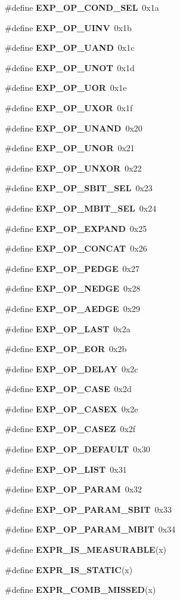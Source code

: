 \begin{CompactItemize}
\#define {\bf EXP\_\-OP\_\-COND\_\-SEL}\ 0x1a
\item 
\#define {\bf EXP\_\-OP\_\-UINV}\ 0x1b
\item 
\#define {\bf EXP\_\-OP\_\-UAND}\ 0x1c
\item 
\#define {\bf EXP\_\-OP\_\-UNOT}\ 0x1d
\item 
\#define {\bf EXP\_\-OP\_\-UOR}\ 0x1e
\item 
\#define {\bf EXP\_\-OP\_\-UXOR}\ 0x1f
\item 
\#define {\bf EXP\_\-OP\_\-UNAND}\ 0x20
\item 
\#define {\bf EXP\_\-OP\_\-UNOR}\ 0x21
\item 
\#define {\bf EXP\_\-OP\_\-UNXOR}\ 0x22
\item 
\#define {\bf EXP\_\-OP\_\-SBIT\_\-SEL}\ 0x23
\item 
\#define {\bf EXP\_\-OP\_\-MBIT\_\-SEL}\ 0x24
\item 
\#define {\bf EXP\_\-OP\_\-EXPAND}\ 0x25
\item 
\#define {\bf EXP\_\-OP\_\-CONCAT}\ 0x26
\item 
\#define {\bf EXP\_\-OP\_\-PEDGE}\ 0x27
\item 
\#define {\bf EXP\_\-OP\_\-NEDGE}\ 0x28
\item 
\#define {\bf EXP\_\-OP\_\-AEDGE}\ 0x29
\item 
\#define {\bf EXP\_\-OP\_\-LAST}\ 0x2a
\item 
\#define {\bf EXP\_\-OP\_\-EOR}\ 0x2b
\item 
\#define {\bf EXP\_\-OP\_\-DELAY}\ 0x2c
\item 
\#define {\bf EXP\_\-OP\_\-CASE}\ 0x2d
\item 
\#define {\bf EXP\_\-OP\_\-CASEX}\ 0x2e
\item 
\#define {\bf EXP\_\-OP\_\-CASEZ}\ 0x2f
\item 
\#define {\bf EXP\_\-OP\_\-DEFAULT}\ 0x30
\item 
\#define {\bf EXP\_\-OP\_\-LIST}\ 0x31
\item 
\#define {\bf EXP\_\-OP\_\-PARAM}\ 0x32
\item 
\#define {\bf EXP\_\-OP\_\-PARAM\_\-SBIT}\ 0x33
\item 
\#define {\bf EXP\_\-OP\_\-PARAM\_\-MBIT}\ 0x34
\item 
\#define {\bf EXPR\_\-IS\_\-MEASURABLE}(x)
\item 
\#define {\bf EXPR\_\-IS\_\-STATIC}(x)
\item 
\#define {\bf EXPR\_\-COMB\_\-MISSED}(x)
\item 

\end{CompactItemize}
